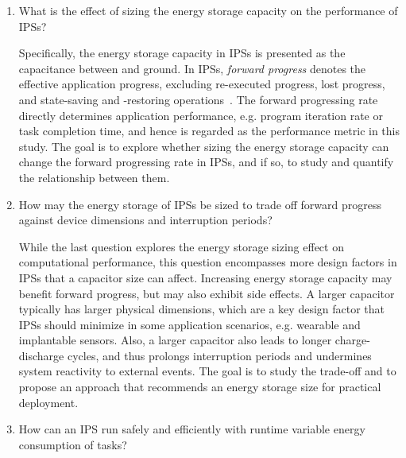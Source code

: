 \begin{enumerate}

\item What is the effect of sizing the energy storage capacity on the performance of IPSs? 

Specifically, the energy storage capacity in IPSs is presented as the capacitance between  and ground. 
In IPSs, \textit{forward progress} denotes the effective application progress, excluding re-executed progress, lost progress, and state-saving and -restoring operations~\cite{7478428}.
The forward progressing rate directly determines application performance, e.g. program iteration rate or task completion time, and hence is regarded as the performance metric in this study. 
The goal is to explore whether sizing the energy storage capacity can change the forward progressing rate in IPSs, and if so, to study and quantify the relationship between them. 

\item How may the energy storage of IPSs be sized to trade off forward progress against device dimensions and interruption periods?

While the last question explores the energy storage sizing effect on computational performance, this question encompasses more design factors in IPSs that a capacitor size can affect. 
Increasing energy storage capacity may benefit forward progress, but may also exhibit side effects. 
A larger capacitor typically has larger physical dimensions, which are a key design factor that IPSs should minimize in some application scenarios, e.g. wearable and implantable sensors. 
Also, a larger capacitor also leads to longer charge-discharge cycles, and thus prolongs interruption periods and undermines system reactivity to external events. 
The goal is to study the trade-off and to propose an approach that recommends an energy storage size for practical deployment.

\item How can an IPS run safely and efficiently with runtime variable energy consumption of tasks?


\end{enumerate}
